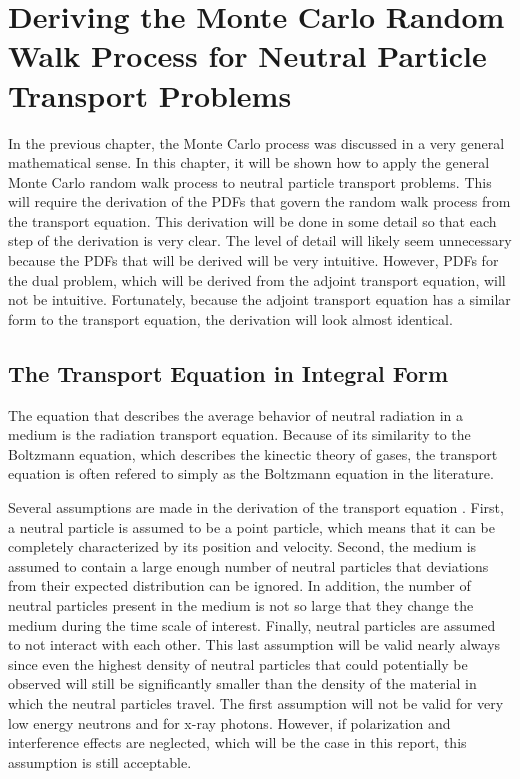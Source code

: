 \chapter{Deriving the Monte Carlo Random Walk Process for Neutral Particle Transport Problems}
\label{ch:neutral_particle_transport}
In the previous chapter, the Monte Carlo process was discussed in a very
general mathematical sense. In this chapter, it will be shown how to apply
the general Monte Carlo random walk process to neutral particle transport 
problems. This will require the derivation of the PDFs that govern the random 
walk process from the transport equation. This derivation will be done in
some detail so that each step of the derivation is very clear. The level of
detail will likely seem unnecessary because the PDFs that will be derived
will be very intuitive. However, PDFs for the dual problem, which will be
derived from the adjoint transport equation, will not be intuitive. 
Fortunately, because the adjoint transport equation has a similar form to the
transport equation, the derivation will look almost identical. 

\section{The Transport Equation in Integral Form}
\label{sec:transport_eqn_integral_form}
The equation that describes the average behavior of neutral radiation in a 
medium is the radiation transport equation. Because of its similarity to the 
Boltzmann equation, which describes the kinectic theory of gases, the 
transport equation is often refered to simply as the Boltzmann equation in the 
literature. 

Several assumptions are made in the derivation of the transport 
equation \citep{bell_nuclear_1979}. First, a neutral particle is assumed to be 
a point particle, which means that it can be completely characterized by its 
position and velocity. Second, the medium is assumed to contain a large
enough number of neutral particles that deviations from their expected 
distribution can be ignored. In addition, the number of neutral particles 
present in the medium is not so large that they change the medium during the 
time scale of interest. Finally, neutral particles are assumed to not interact 
with each other. This last assumption will be valid nearly always since even 
the highest density of neutral particles that could potentially be observed 
will still be significantly smaller than the density of the material in which 
the neutral particles travel. The first assumption will not be valid for very 
low energy neutrons and for x-ray photons. However, if polarization and 
interference effects are neglected, which will be the case in this report,
this assumption is still acceptable. 

